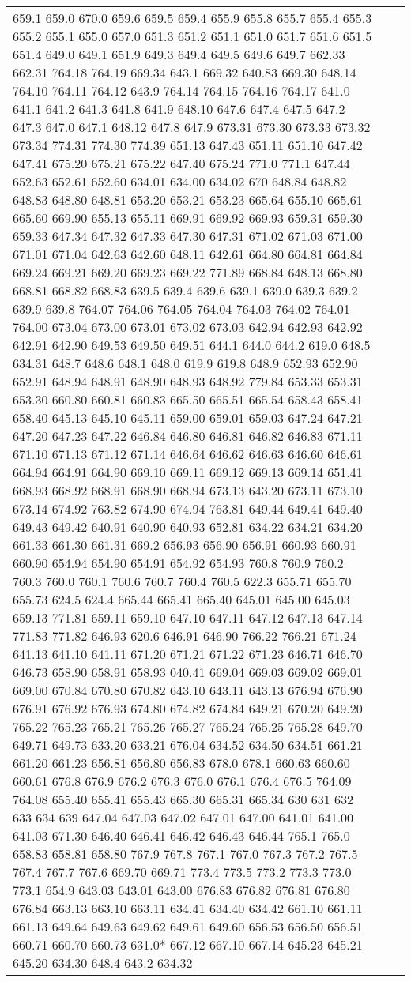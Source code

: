 \begin{longtable}{|R{.05in}|L{.5in}||L{5.75in}|}
659.1 659.0 670.0 659.6 659.5 659.4 655.9 655.8 655.7 655.4 655.3 655.2 655.1 655.0 657.0 651.3 651.2 651.1 651.0 651.7 651.6 651.5 651.4 649.0 649.1 651.9 649.3 649.4 649.5 649.6 649.7 662.33 662.31 764.18 764.19 669.34 643.1 669.32 640.83 669.30 648.14 764.10 764.11 764.12 643.9 764.14 764.15 764.16 764.17 641.0 641.1 641.2 641.3 641.8 641.9 648.10 647.6 647.4 647.5 647.2 647.3 647.0 647.1 648.12 647.8 647.9 673.31 673.30 673.33 673.32 673.34 774.31 774.30 774.39 651.13 647.43 651.11 651.10 647.42 647.41 675.20 675.21 675.22 647.40 675.24 771.0 771.1 647.44 652.63 652.61 652.60 634.01 634.00 634.02 670 648.84 648.82 648.83 648.80 648.81 653.20 653.21 653.23 665.64 655.10 665.61 665.60 669.90 655.13 655.11 669.91 669.92 669.93 659.31 659.30 659.33 647.34 647.32 647.33 647.30 647.31 671.02 671.03 671.00 671.01 671.04 642.63 642.60 648.11 642.61 664.80 664.81 664.84 669.24 669.21 669.20 669.23 669.22 771.89 668.84 648.13 668.80 668.81 668.82 668.83 639.5 639.4 639.6 639.1 639.0 639.3 639.2 639.9 639.8 764.07 764.06 764.05 764.04 764.03 764.02 764.01 764.00 673.04 673.00 673.01 673.02 673.03 642.94 642.93 642.92 642.91 642.90 649.53 649.50 649.51 644.1 644.0 644.2 619.0 648.5 634.31 648.7 648.6 648.1 648.0 619.9 619.8 648.9 652.93 652.90 652.91 648.94 648.91 648.90 648.93 648.92 779.84 653.33 653.31 653.30 660.80 660.81 660.83 665.50 665.51 665.54 658.43 658.41 658.40 645.13 645.10 645.11 659.00 659.01 659.03 647.24 647.21 647.20 647.23 647.22 646.84 646.80 646.81 646.82 646.83 671.11 671.10 671.13 671.12 671.14 646.64 646.62 646.63 646.60 646.61 664.94 664.91 664.90 669.10 669.11 669.12 669.13 669.14 651.41 668.93 668.92 668.91 668.90 668.94 673.13 643.20 673.11 673.10 673.14 674.92 763.82 674.90 674.94 763.81 649.44 649.41 649.40 649.43 649.42 640.91 640.90 640.93 652.81 634.22 634.21 634.20 661.33 661.30 661.31 669.2 656.93 656.90 656.91 660.93 660.91 660.90 654.94 654.90 654.91 654.92 654.93 760.8 760.9 760.2 760.3 760.0 760.1 760.6 760.7 760.4 760.5 622.3 655.71 655.70 655.73 624.5 624.4 665.44 665.41 665.40 645.01 645.00 645.03 659.13 771.81 659.11 659.10 647.10 647.11 647.12 647.13 647.14 771.83 771.82 646.93 620.6 646.91 646.90 766.22 766.21 671.24 641.13 641.10 641.11 671.20 671.21 671.22 671.23 646.71 646.70 646.73 658.90 658.91 658.93 040.41 669.04 669.03 669.02 669.01 669.00 670.84 670.80 670.82 643.10 643.11 643.13 676.94 676.90 676.91 676.92 676.93 674.80 674.82 674.84 649.21 670.20 649.20 765.22 765.23 765.21 765.26 765.27 765.24 765.25 765.28 649.70 649.71 649.73 633.20 633.21 676.04 634.52 634.50 634.51 661.21 661.20 661.23 656.81 656.80 656.83 678.0 678.1 660.63 660.60 660.61 676.8 676.9 676.2 676.3 676.0 676.1 676.4 676.5 764.09 764.08 655.40 655.41 655.43 665.30 665.31 665.34 630 631 632 633 634 639 647.04 647.03 647.02 647.01 647.00 641.01 641.00 641.03 671.30 646.40 646.41 646.42 646.43 646.44 765.1 765.0 658.83 658.81 658.80 767.9 767.8 767.1 767.0 767.3 767.2 767.5 767.4 767.7 767.6 669.70 669.71 773.4 773.5 773.2 773.3 773.0 773.1 654.9 643.03 643.01 643.00 676.83 676.82 676.81 676.80 676.84 663.13 663.10 663.11 634.41 634.40 634.42 661.10 661.11 661.13 649.64 649.63 649.62 649.61 649.60 656.53 656.50 656.51 660.71 660.70 660.73 631.0* 667.12 667.10 667.14 645.23 645.21 645.20 634.30 648.4 643.2 634.32 
\end{longtable}
